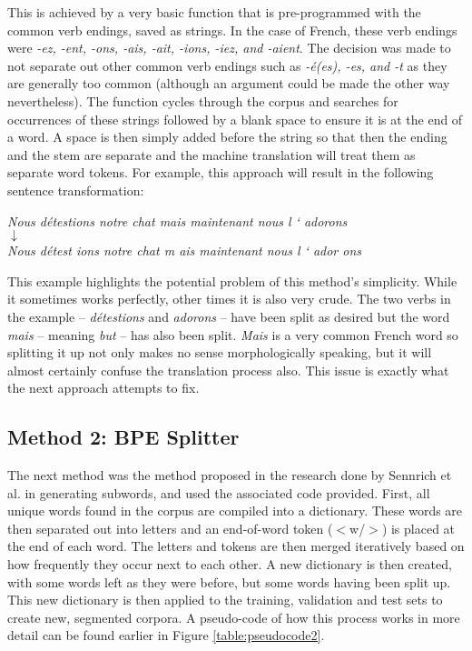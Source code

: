 \documentclass[11pt]{article}
\begin{document}
This is achieved by a very basic function that is pre-programmed with the common verb endings, saved as strings. In the case of French, these verb endings were \textit{-ez, -ent, -ons, -ais, -ait, -ions, -iez, and -aient}. The decision was made to not separate out other common verb endings such as \textit{-é(es), -es, and -t} as they are generally too common (although an argument could be made the other way nevertheless). The function cycles through the corpus and searches for occurrences of these strings followed by a blank space to ensure it is at the end of a word. A space is then simply added before the string so that then the ending and the stem are separate and the machine translation will treat them as separate word tokens. For example, this approach will result in the following sentence transformation:

\bigskip
\begin{center}
\textit{Nous détestions notre chat mais maintenant nous l ‘ adorons} \\
\medskip
$\downarrow$ \\
\medskip
\textit{Nous détest ions notre chat m ais maintenant nous l ‘ ador ons}
\end{center}
\bigskip

This example highlights the potential problem of this method’s simplicity. While it sometimes works perfectly, other times it is also very crude. The two verbs in the example -- \textit{détestions} and \textit{adorons} -- have been split as desired but the word \textit{mais} -- meaning \textit{but} -- has also been split. \textit{Mais} is a very common French word so splitting it up not only makes no sense morphologically speaking, but it will almost certainly confuse the translation process also. This issue is exactly what the next approach attempts to fix.

\subsection{Method 2: BPE Splitter}

The next method was the method proposed in the research done by Sennrich et al. \citeyearpar{sennrich-etal-2016-neural} in generating subwords, and used the associated code provided. First, all unique words found in the corpus are compiled into a dictionary. These words are then separated out into letters and an end-of-word token ($<$w/$>$) is placed at the end of each word. The letters and tokens are then merged iteratively based on how frequently they occur next to each other. A new dictionary is then created, with some words left as they were before, but some words having been split up. This new dictionary is then applied to the training, validation and test sets to create new, segmented corpora. A pseudo-code of how this process works in more detail can be found earlier in Figure \ref{table:pseudocode2}.
\end{document}
